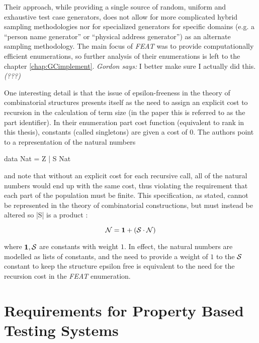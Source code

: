 \documentclass[11pt]{report}
\newcommand{\gordon}[1]{{\textit{Gordon says:} #1 \textit{(???)}}}
\newcommand{\FEAT}{\textit{FEAT}\xspace}
\begin{document}
Their approach, while providing a single source of random, uniform and exhaustive test case generators,
does not allow for more complicated hybrid sampling methodologies
nor for specialized generators for specific domains (e.g. a ``person name generator'' or ``physical address generator'')
as an alternate sampling methodology.
The main focus of \FEAT was to provide computationally efficient enumerations,
so further analysis of their enumerations is left to the chapter \ref{chap:GCimplement}.
\gordon{I better make sure I actually did this.}

One interesting detail is that the issue of epsilon-freeness in the theory of combinatorial structures
presents itself as the need to assign an explicit cost to recursion in the calculation of term size
(in the paper this is referred to as the part identifier).
In their enumeration part cost function (equivalent to rank in this thesis),
constants (called singletons) are given a cost of $0$.
The authors point to a representation of the natural numbers

\begin{code}
data Nat = Z | S Nat
\end{code}

and note that without an explicit cost for each recursive call,
all of the natural numbers would end up with the same cost,
thus violating the requirement that each part of the population must be finite.
This specification, as stated, cannot be represented in the theory of combinatorial constructions,
but must instead be altered so |S| is a product :

$$ \mathcal{N} = \mathbf{1} + (\mathcal{S} \cdot \mathcal{N}) $$

where $\mathbf{1}, \mathcal{S}$ are constants with weight $1$.
In effect, the natural numbers are modelled as lists of constants,
and the need to provide a weight of $1$ to the $\mathcal{S}$ constant to keep the structure epsilon free
is equivalent to the need for the recursion cost in the \FEAT enumeration.




\setcounter{figure}{0}
\setcounter{equation}{0}
\setcounter{table}{0}
\chapter{Requirements for Property Based Testing Systems}\label{chap:requirements}


\end{document}
